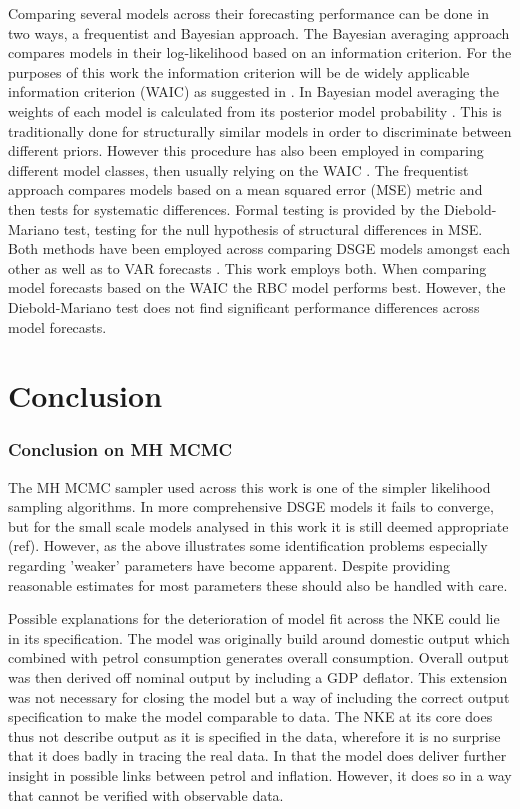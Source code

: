 \documentclass[12pt,a4paper,english]{article} %
\let\oldsection\section
\renewcommand\section{\clearpage\oldsection}
\begin{document}
	Comparing several models across their forecasting performance can be done in two ways, a frequentist and Bayesian approach.
	The Bayesian averaging approach compares models in their log-likelihood based on an information criterion. For the purposes of this work the information criterion will be de widely applicable information criterion (WAIC) as suggested in \cite{chin_bayesian_2019}. In Bayesian model averaging the weights of each model is calculated from its posterior model probability \cite{chin_bayesian_2019}. This is traditionally done for structurally similar models in order to discriminate between different priors. However this procedure has also been employed in comparing different model classes, then usually relying on the WAIC \cite{chin_bayesian_2019}.
	The frequentist approach compares models based on a mean squared error (MSE) metric and then tests for systematic differences. Formal testing is provided by the Diebold-Mariano test, testing for the null hypothesis of structural differences in MSE. 
	Both methods have been employed across comparing DSGE models amongst each other as well as to VAR forecasts  \cite{chin_bayesian_2019}. This work employs both. When comparing model forecasts based on the WAIC the RBC model performs best. However, the Diebold-Mariano test does not find significant performance differences across model forecasts.

	
	\section{Conclusion}
	\subsubsection{Conclusion on MH MCMC}
	The MH MCMC sampler used across this work is one of the simpler likelihood sampling algorithms. In more comprehensive DSGE models it fails to converge, but for the small scale models analysed in this work it is still deemed appropriate (ref). However, as the above illustrates some identification problems especially regarding 'weaker' parameters have become apparent. Despite providing reasonable estimates for most parameters these should also be handled with care. 
	
	Possible explanations for the deterioration of model fit across the NKE could lie in its specification. The model was originally build around domestic output which combined with petrol consumption generates overall consumption. Overall output was then derived off nominal output by including a GDP deflator. This extension was not necessary for closing the model but a way of including the correct output specification to make the model comparable to data. The NKE at its core does thus not describe output as it is specified in the data, wherefore it is no surprise that it does badly in tracing the real data. In that the model does deliver further insight in possible links between petrol and inflation. However, it does so in a way that cannot be verified with observable data.
	
\end{document}
